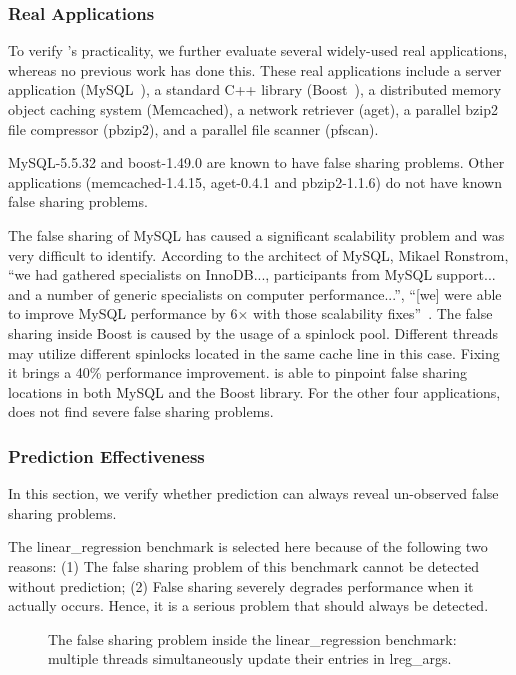 \subsubsection{Real Applications}
To verify \Predator{}'s practicality, we further evaluate several widely-used real applications, whereas no previous work has done this. These real applications include a server application (MySQL~\cite{mysql}),
a standard C++ library (Boost~\cite{libfalsesharing}),
a distributed memory object caching system (Memcached), a network retriever (aget),
a parallel bzip2 file compressor (pbzip2), and a parallel file scanner (pfscan).

MySQL-5.5.32 and boost-1.49.0 are known to have false sharing problems. Other applications (memcached-1.4.15, aget-0.4.1 and pbzip2-1.1.6) do not have known false sharing problems.

The false sharing of MySQL has caused a significant scalability problem and was very difficult to identify.
According to the architect of MySQL, Mikael Ronstrom, ``we had gathered specialists on InnoDB..., participants from MySQL support... and a number of generic specialists on 
computer performance...'', ``[we] were able to improve MySQL performance by 6$\times$ with those scalability fixes''~\cite{mysql}. 
The false sharing inside Boost is caused by the usage of a  spinlock pool. Different threads may utilize different spinlocks located in the same cache line in this case. Fixing it brings a 40\% performance improvement.
\Predator{} is able to pinpoint false sharing locations in both MySQL and the Boost library. 
For the other four applications, \Predator{} does not find severe false sharing problems.

\subsubsection{Prediction Effectiveness}
\label{sec:predicteval}
In this section, we verify whether prediction can always  reveal un-observed false sharing problems.

The linear\_regression benchmark is selected here because of the following two reasons: (1) The false sharing problem of this benchmark cannot be detected without prediction; (2) False sharing severely degrades performance when it actually occurs. Hence, it is a serious problem that should always be detected. 

\begin{figure}[!t]
{\centering
\subfigure{}
\caption{The false sharing problem inside the linear\_regression benchmark: multiple threads simultaneously update their entries in lreg\_args.
\label{fig:linearregression}}
}
\end{figure}

